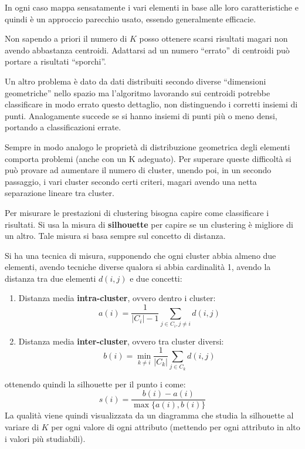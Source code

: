 In ogni caso mappa sensatamente i vari elementi in base alle loro caratteristiche
e quindi è un approccio parecchio usato, essendo generalmente efficacie.

Non sapendo a priori il numero di $K$ posso ottenere scarsi risultati magari non
avendo abbastanza centroidi. Adattarsi ad un numero “errato” di centroidi può
portare a risultati “sporchi”.

Un altro problema è dato da dati distribuiti secondo diverse “dimensioni geometriche” nello
spazio ma l'algoritmo lavorando sui centroidi potrebbe classificare in modo errato
questo dettaglio, non distinguendo i corretti insiemi di punti. Analogamente
succede se si hanno insiemi di punti più o meno densi, portando a classificazioni errate.

Sempre in modo analogo le proprietà di distribuzione geometrica degli elementi
comporta problemi (anche con un K adeguato). Per superare queste difficoltà si
può provare ad aumentare il numero di cluster, unendo poi, in un secondo passaggio,
i vari cluster secondo certi criteri, magari avendo una netta separazione lineare tra cluster.

Per misurare le prestazioni di clustering bisogna capire come classificare i
risultati. Si usa la misura di \textbf{silhouette} per capire se un clustering è
migliore di un altro. Tale misura si basa sempre sul concetto di distanza.

Si ha una tecnica di misura, supponendo che ogni cluster abbia almeno due elementi,
avendo tecniche diverse qualora si abbia cardinalità 1, avendo la distanza tra
due elementi $d(i, j)$ e due concetti:
\begin{enumerate}
    \item Distanza media \textbf{intra-cluster}, ovvero dentro i cluster:
          \begin{equation}
              a(i) = \frac{1}{|C_i| - 1} \sum_{j \in C_i, j \neq i} d(i, j)
          \end{equation}
    \item Distanza media \textbf{inter-cluster}, ovvero tra cluster diversi:
          \begin{equation}
              b(i) = \min_{k \neq i} \frac{1}{|C_k|} \sum_{j \in C_k} d(i, j)
          \end{equation}
\end{enumerate}
ottenendo quindi la silhouette per il punto i come:
\begin{equation}
    s(i) = \frac{b(i) - a(i)}{\max\{a(i), b(i)\}}
\end{equation}
La qualità viene quindi visualizzata da un diagramma che studia la silhouette al
variare di $K$ per ogni valore di ogni attributo (mettendo per ogni attributo in
alto i valori più studiabili).

